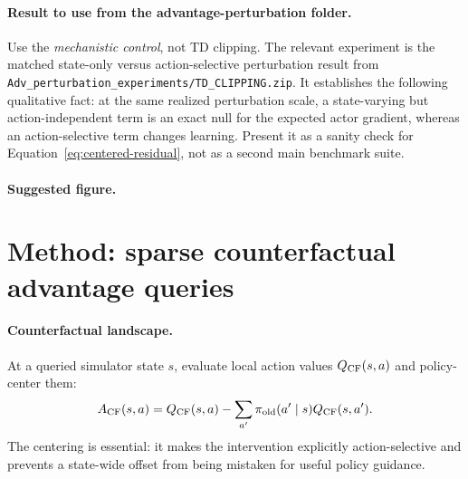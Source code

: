 \documentclass[11pt]{article}
\begin{document}
\paragraph{Result to use from the advantage-perturbation folder.}
Use the \emph{mechanistic control}, not TD clipping. The relevant experiment is
the matched state-only versus action-selective perturbation result from
\texttt{Adv\_perturbation\_experiments/TD\_CLIPPING.zip}. It establishes the
following qualitative fact: at the same realized perturbation scale, a
state-varying but action-independent term is an exact null for the expected
actor gradient, whereas an action-selective term changes learning. Present it
as a sanity check for Equation~\eqref{eq:centered-residual}, not as a second
main benchmark suite.

\paragraph{Suggested figure.}
\begin{center}
\end{center}

\section{Method: sparse counterfactual advantage queries}
\label{sec:method}

\paragraph{Counterfactual landscape.}
At a queried simulator state $s$, evaluate local action values
$Q_{\rm CF}(s,a)$ and policy-center them:
\begin{equation}
 A_{\rm CF}(s,a) = Q_{\rm CF}(s,a) -
 \sum_{a'}\pi_{\rm old}(a'\mid s)Q_{\rm CF}(s,a').
 \label{eq:cf-advantage}
\end{equation}
The centering is essential: it makes the intervention explicitly
action-selective and prevents a state-wide offset from being mistaken for
useful policy guidance.
\end{document}
